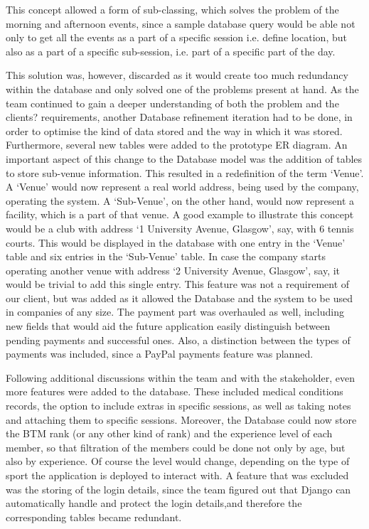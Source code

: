 \documentclass{l3proj}
\begin{document}
\par
This concept allowed a form of sub-classing, which solves the problem of the morning and afternoon events, since a sample database query would be able not only to get all the events as a part of a specific session i.e. define location, but also as a part of a specific sub-session, i.e. part of a specific part of the day.\\
\par This solution was, however, discarded as it would create too much redundancy within the database and only solved one of the problems present at hand. As the team continued to gain a deeper understanding of both the problem and the clients? requirements, another Database refinement iteration had to be done, in order to optimise the kind of data stored and the way in which it was stored. Furthermore, several new tables were added to the prototype ER diagram. An important aspect of this change to the Database model was the addition of tables to store sub-venue information. This resulted in a redefinition of the term `Venue'. A `Venue' would now represent a real world address, being used by the company, operating the system. A `Sub-Venue', on the other hand, would now represent a facility, which is a part of that venue. A good example to illustrate this concept would be a club with address `1 University Avenue, Glasgow', say, with 6 tennis courts. This would be displayed in the database with one entry in the `Venue' table and six entries in the `Sub-Venue' table. In case the company starts operating another venue with address `2 University Avenue, Glasgow', say, it would be trivial to add this single entry. This feature was not a requirement of our client, but was added as it allowed the Database and the system to be used in companies of any size. The payment part was overhauled as well, including new fields that would aid the future application easily distinguish between pending payments and successful ones. Also, a distinction between the types of payments was included, since a PayPal payments feature was planned.\\
\par Following additional discussions within the team and with the stakeholder, even more features were added to the database. These included medical conditions records, the option to include extras in specific sessions, as well as taking notes and attaching them to specific sessions. Moreover, the Database could now store the BTM rank (or any other kind of rank) and the experience level of each member, so that filtration of the members could be done not only by age, but also by experience.  Of course the level would change, depending on the type of sport the application is deployed to interact with. A feature that was excluded was the storing of the login details, since the team figured out that Django can automatically handle and protect the login details,and therefore the corresponding tables became redundant.\\
\end{document}
